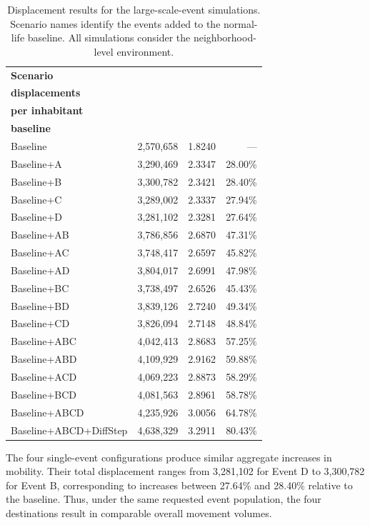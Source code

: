\begin{table}[ht]
\centering
\caption{Displacement results for the large-scale-event simulations. Scenario names identify the events added to the normal-life baseline. All simulations consider the neighborhood-level environment.}
\label{tbl:results_displacement}
\begin{tabular}{@{}lrrr@{}}
\toprule
\textbf{Scenario} &
\shortstack{\textbf{Total}\\\textbf{displacements}} &
\shortstack{\textbf{Displacements}\\\textbf{per inhabitant}} &
\shortstack{\textbf{Increase over}\\\textbf{baseline}} \\
\midrule
Baseline               & 2,570,658 & 1.8240 & --- \\
\midrule
Baseline+A             & 3,290,469 & 2.3347 & 28.00\% \\
Baseline+B             & 3,300,782 & 2.3421 & 28.40\% \\
Baseline+C             & 3,289,002 & 2.3337 & 27.94\% \\
Baseline+D             & 3,281,102 & 2.3281 & 27.64\% \\
\midrule
Baseline+AB            & 3,786,856 & 2.6870 & 47.31\% \\
Baseline+AC            & 3,748,417 & 2.6597 & 45.82\% \\
Baseline+AD            & 3,804,017 & 2.6991 & 47.98\% \\
Baseline+BC            & 3,738,497 & 2.6526 & 45.43\% \\
Baseline+BD            & 3,839,126 & 2.7240 & 49.34\% \\
Baseline+CD            & 3,826,094 & 2.7148 & 48.84\% \\
\midrule
Baseline+ABC           & 4,042,413 & 2.8683 & 57.25\% \\
Baseline+ABD           & 4,109,929 & 2.9162 & 59.88\% \\
Baseline+ACD           & 4,069,223 & 2.8873 & 58.29\% \\
Baseline+BCD           & 4,081,563 & 2.8961 & 58.78\% \\
\midrule
Baseline+ABCD          & 4,235,926 & 3.0056 & 64.78\% \\
Baseline+ABCD+DiffStep & 4,638,329 & 3.2911 & 80.43\% \\
\bottomrule
\end{tabular}
\end{table}

The four single-event configurations produce similar aggregate increases in mobility. Their total displacement ranges from 3,281,102 for Event D to 3,300,782 for Event B, corresponding to increases between 27.64\% and 28.40\% relative to the baseline. Thus, under the same requested event population, the four destinations result in comparable overall movement volumes.

